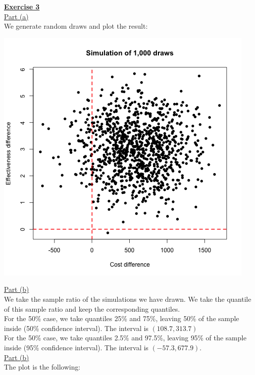 \documentclass[a4paper, 11pt]{article}
\begin{document}
\newpage
\textbf{\underline{Exercise 3}}\\
\newline \underline{Part (a)}\\
\newline We generate random draws and plot the result:
\begin{center}
\includegraphics[scale=0.6]{plot_ex3dot1.png}
\end{center}
\underline{Part (b)}\\
\newline We take the sample ratio of the simulations we have drawn. We take the quantile of this sample ratio and keep the corresponding quantiles.\\
\newline For the 50\% case, we take quantiles 25\% and 75\%, leaving 50\% of the sample inside (50\% confidence interval). The interval is $(108.7, 313.7)$\\
\newline For the 50\% case, we take quantiles 2.5\% and 97.5\%, leaving 95\% of the sample inside (95\% confidence interval). The interval is $(-57.3, 677.9)$.\\
\newline \underline{Part (b)}\\
\newline The plot is the following:
\end{document}
